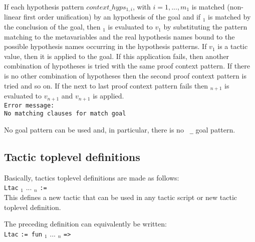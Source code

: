 
If each hypothesis pattern $context\_hyps_{1,i}$, with $i=1,...,m_1$
is matched (non-linear first order unification) by an hypothesis of
the goal and if {\pattern}$_1$ is matched by the conclusion of the
goal, then {\tacexpr}$_1$ is evaluated to $v_1$ by substituting the
pattern matching to the metavariables and the real hypothesis names
bound to the possible hypothesis names occurring in the hypothesis
patterns. If $v_1$ is a tactic value, then it is applied to the
goal. If this application fails, then another combination of
hypotheses is tried with the same proof context pattern. If there is
no other combination of hypotheses then the second proof context
pattern is tried and so on. If the next to last proof context pattern
fails then {\tacexpr}$_{n+1}$ is evaluated to $v_{n+1}$ and $v_{n+1}$
is applied.\\

{\tt Error message:}\\

{\tt No matching clauses for match goal}

No goal pattern can be used and, in particular, there is no {\tt
\_} goal pattern.

\subsection{Tactic toplevel definitions}

Basically, tactics toplevel definitions are made as follows:\\

%
%

{\tt Ltac} {\ident} {\ident}$_1$ ... {\ident}$_n$ {\tt :=}
{\tacexpr}\\

\noindent This defines a new tactic that can be used in any tactic script or new tactic toplevel definition.

\Rem The preceding definition can equivalently be written:\\

{\tt Ltac} {\ident} {\tt := fun} {\ident}$_1$ ... {\ident}$_n$
{\tt =>} {\tacexpr}\\

